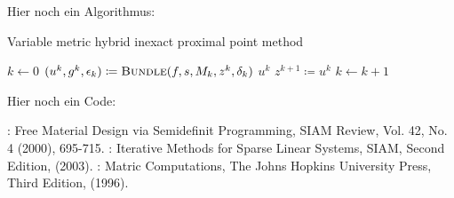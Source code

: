 \newpage

Hier noch ein Algorithmus:

\begin{algorithm}[ht]
\caption{Variable metric hybrid inexact proximal point
method}\label{SG_alg:vmhippm}
\begin{algorithmic}[1]
 \State $k \gets 0$
   \State $(u^k, g^k, \epsilon_k) \coloneqq \Call{Bundle}{f, s, M_k,
z^k, \delta_k}$ 
\State \Return $u^k$  \EndIf
   \State $z^{k+1} \coloneqq u^k$ 
   \State $k \gets k + 1$
 \EndWhile
\EndFunction
\end{algorithmic}
\end{algorithm}



Hier noch ein Code: 




\begin{thebibliography}{2}
: Free Material Design via Semidefinit
Programming, SIAM Review, Vol. 42, No. 4 (2000), 695-715.
 : Iterative Methods for Sparse Linear Systems, SIAM, Second Edition, (2003).
 : Matric Computations, The Johns Hopkins University Press, Third Edition, (1996).
\end{thebibliography}